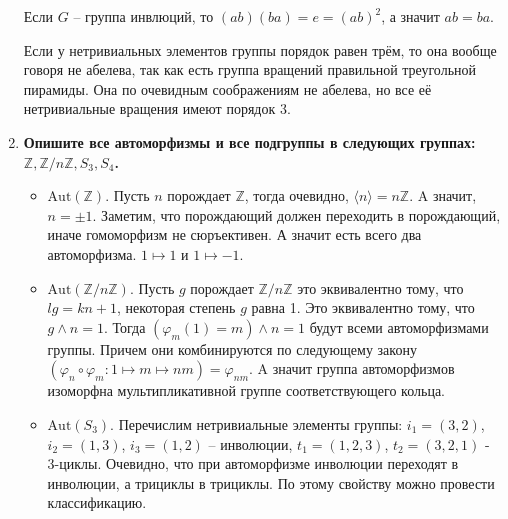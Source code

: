 \documentclass{article}
\begin{document}
\begin{enumerate}
        Если $G$ – группа инвлюций, то $(ab)(ba)=e=(ab)^2$, а значит $ab=ba$.

        Если у нетривиальных элементов группы порядок равен трём, то она вообще
        говоря не абелева, так как есть группа вращений правильной треугольной
        пирамиды. Она по очевидным соображениям не абелева, но все её
        нетривиальные вращения имеют порядок 3.

    \item \textbf{Опишите все автоморфизмы и все подгруппы в следующих группах:
        $\mathbb{Z}, \mathbb{Z}/n\mathbb{Z}, S_3, S_4$.}
        \begin{itemize}
            \item $\text{Aut}(\mathbb{Z})$. Пусть $n$ порождает $\mathbb{Z}$,
                тогда очевидно, $\langle n\rangle=n\mathbb{Z}$. A значит,
                $n=\pm 1$. Заметим, что порождающий должен переходить в
                порождающий, иначе гомоморфизм не сюръективен. А значит есть
                всего два автоморфизма. $1\mapsto 1$ и $1\mapsto -1$.

            \item $\text{Aut}(\mathbb{Z}/n\mathbb{Z})$. Пусть $g$ порождает
                $\mathbb{Z}/n\mathbb{Z}$ это эквивалентно тому, что $lg=kn+1$,
                некоторая степень $g$ равна 1. Это эквивалентно тому, что
                $g\wedge n=1$. Тогда $(\varphi_m(1)=m)\wedge n=1$ будут
                всеми автоморфизмами группы. Причем они комбинируются по
                следующему закону $(\varphi_n \circ \varphi_m: 1\mapsto m\mapsto
                nm)=\varphi_{nm}$. A значит группа автоморфизмов изоморфна
                мультипликативной группе соответствующего кольца.
                
            \item $\text{Aut}(S_3)$. Перечислим нетривиальные элементы группы:
                $i_1=(3,2)$, $i_2=(1,3)$, $i_3=(1,2)$ – инволюции, $t_1=(1,2,3)$,
                $t_2=(3,2,1)$ - 3-циклы. Очевидно, что при автоморфизме
                инволюции переходят в инволюции, а трициклы в трициклы. По этому
                свойству можно провести классификацию.


\end{itemize}
\end{enumerate}
\end{document}
